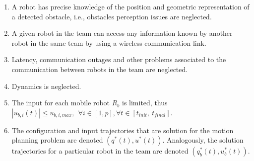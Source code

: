 \begin{enumerate}
    \item A robot has precise knowledge of the position and geometric 
    representation of a detected obstacle, i.e., obstacles perception issues
    are neglected.
    
    \item A given robot in the team can access 
    any information known by another robot in the same team by using 
    a wireless communication link.
    
    \item Latency, communication outages and other problems associated
    to the communication between robots in the team are neglected.
        
    \item Dynamics is neglected.
    
    \item The input for each mobile robot $R_b$ is limited, thus $|u_{b,i}(t)| \leq u_{b,i,max},\ \ \forall i \in [1,p],\forall t \in [t_{init},\ t_{final}]$.
    
    \item The configuration and input trajectories that are solution for the motion planning problem are denoted $(q^{*}(t), u^{*}(t))$. Analogously, the solution trajectories for a particular robot in the team are denoted $(q_b^{*}(t), u_b^{*}(t))$.
    

%    

\end{enumerate}

